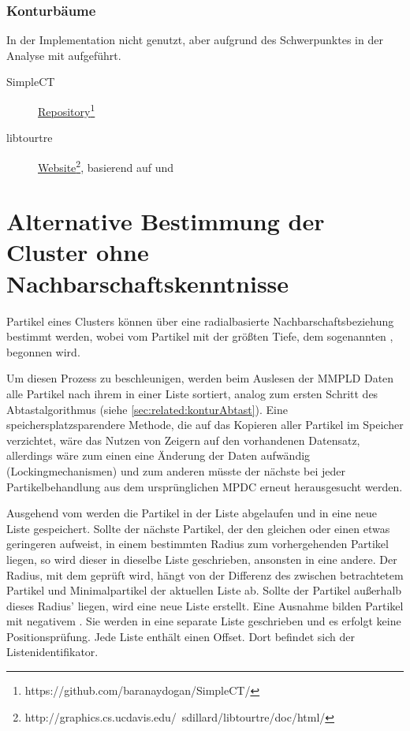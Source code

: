 \subsubsection{Konturbäume}
In der Implementation nicht genutzt, aber aufgrund des Schwerpunktes in der Analyse mit aufgeführt.
\begin{description}
	\item [SimpleCT]  \href{https://github.com/baranaydogan/SimpleCT/}{Repository}\footnote{https://github.com/baranaydogan/SimpleCT/} \cite{aydogan2013contourTreeBinary}
	\item [libtourtre] \href{http://graphics.cs.ucdavis.edu/~sdillard/libtourtre/doc/html/}{Website}\footnote{http://graphics.cs.ucdavis.edu/~sdillard/libtourtre/doc/html/}, basierend auf \cite{carr2001computingCountourTrees} und \cite{pascucci2004multiResolutionComputation}
\end{description}

\section{Alternative Bestimmung der Cluster ohne Nachbarschaftskenntnisse}\label{sec:cluster-radial}
Partikel eines Clusters können über eine radialbasierte Nachbarschaftsbeziehung bestimmt werden, wobei vom Partikel mit der größten Tiefe, dem sogenannten , begonnen wird.

Um diesen Prozess zu beschleunigen, werden beim Auslesen der MMPLD Daten alle Partikel nach ihrem  in einer Liste sortiert, analog zum ersten Schritt des Abtastalgorithmus (siehe \autoref{sec:related:konturAbtast}). Eine speichersplatzsparendere Methode, die auf das Kopieren aller Partikel im Speicher verzichtet, wäre das Nutzen von Zeigern auf den vorhandenen Datensatz, allerdings wäre zum einen eine Änderung der Daten aufwändig (Lockingmechanismen) und zum anderen müsste der nächste  bei jeder Partikelbehandlung aus dem ursprünglichen MPDC erneut herausgesucht werden.

Ausgehend vom  werden die Partikel in der Liste abgelaufen und in eine neue Liste gespeichert. Sollte der nächste Partikel, der den gleichen oder einen etwas geringeren  aufweist, in einem bestimmten Radius zum vorhergehenden Partikel liegen, so wird dieser in dieselbe Liste geschrieben, ansonsten in eine andere. Der Radius, mit dem geprüft wird, hängt von der Differenz des  zwischen betrachtetem Partikel und Minimalpartikel der aktuellen Liste ab. Sollte der Partikel außerhalb dieses Radius' liegen, wird eine neue Liste erstellt. Eine Ausnahme bilden Partikel mit negativem . Sie werden in eine separate Liste geschrieben und es erfolgt keine Positionsprüfung. Jede Liste enthält einen Offset. Dort befindet sich der Listenidentifikator.

